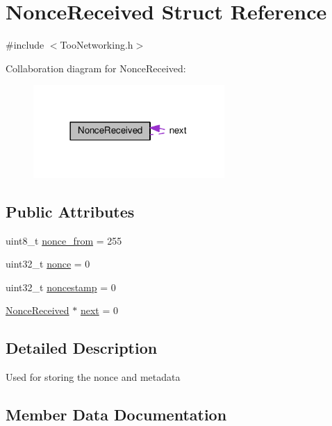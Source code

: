 \hypertarget{structNonceReceived}{}\section{Nonce\+Received Struct Reference}
\label{structNonceReceived}


{\ttfamily \#include $<$Too\+Networking.\+h$>$}



Collaboration diagram for Nonce\+Received\+:
\nopagebreak
\begin{figure}[H]
\begin{center}
\leavevmode
\includegraphics[width=206pt]{structNonceReceived__coll__graph}
\end{center}
\end{figure}
\subsection*{Public Attributes}
\begin{DoxyCompactItemize}
\item 
uint8\+\_\+t \hyperlink{structNonceReceived_aa6f2777bb591400ce057bd1fa9b23fca}{nonce\+\_\+from} = 255
\item 
uint32\+\_\+t \hyperlink{structNonceReceived_a8da2f90de05746f252706f24ec5bc539}{nonce} = 0
\item 
uint32\+\_\+t \hyperlink{structNonceReceived_ae159a71415a2908807ef1ed39f0b9dfa}{noncestamp} = 0
\item 
\hyperlink{structNonceReceived}{Nonce\+Received} $\ast$ \hyperlink{structNonceReceived_ad976d0df8941f1f626de24afd2febca7}{next} = 0
\end{DoxyCompactItemize}


\subsection{Detailed Description}
Used for storing the nonce and metadata 

\subsection{Member Data Documentation}
\mbox{\label{structNonceReceived_ad976d0df8941f1f626de24afd2febca7}} 
